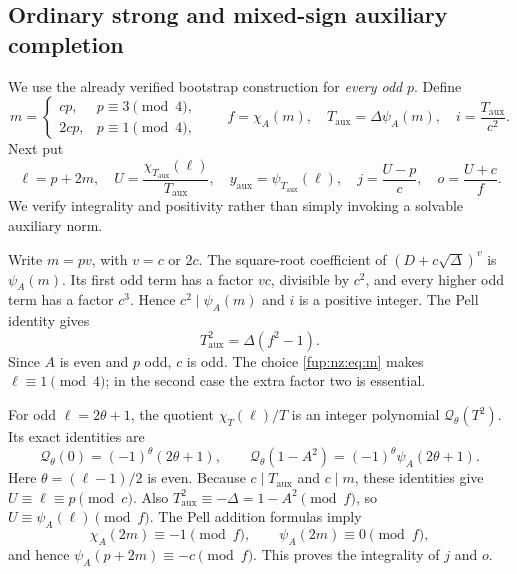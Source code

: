 \documentclass[11pt,letterpaper]{article}
\theoremstyle{definition}\newtheorem{definition}[theorem]{Definition}
\theoremstyle{remark}\newtheorem{remark}[theorem]{Remark}
\newcommand{\Taux}{T_{\mathrm{aux}}}\newcommand{\yaux}{y_{\mathrm{aux}}}
\begin{document}
\subsection{Ordinary strong and mixed-sign auxiliary completion}
We use the already verified bootstrap construction for \emph{every odd} $p$. Define
\begin{equation}\label{fup:nz:eq:m}
 m=\begin{cases}cp,&p\equiv3\pmod4,\\2cp,&p\equiv1\pmod4,\end{cases}
 \qquad f=\chi_A(m),\quad \Taux=\Delta\psi_A(m),\quad
 i=\frac{\Taux}{c^2}.
\end{equation}
Next put
\begin{equation}\label{fup:nz:eq:auxwitness}
 \ell=p+2m,\quad U=\frac{\chi_{\Taux}(\ell)}{\Taux},\quad
 \yaux=\psi_{\Taux}(\ell),\quad
 j=\frac{U-p}{c},\quad o=\frac{U+c}{f}.
\end{equation}
We verify integrality and positivity rather than simply invoking a solvable auxiliary norm.

Write $m=pv$, with $v=c$ or $2c$. The square-root coefficient of $(D+c\sqrt\Delta)^v$ is $\psi_A(m)$. Its first odd term has a factor $vc$, divisible by $c^2$, and every higher odd term has a factor $c^3$. Hence $c^2\mid\psi_A(m)$ and $i$ is a positive integer. The Pell identity gives
\[
 \Taux^2=\Delta(f^2-1).
\]
Since $A$ is even and $p$ odd, $c$ is odd. The choice \eqref{fup:nz:eq:m} makes $\ell\equiv1\pmod4$; in the second case the extra factor two is essential.

For odd $\ell=2\theta+1$, the quotient $\chi_T(\ell)/T$ is an integer polynomial $\mathcal Q_\theta(T^2)$. Its exact identities are
\[
 \mathcal Q_\theta(0)=(-1)^{\theta}(2\theta+1),\qquad
 \mathcal Q_\theta(1-A^2)=(-1)^{\theta}\psi_A(2\theta+1).
\]
Here $\theta=(\ell-1)/2$ is even. Because $c\mid\Taux$ and $c\mid m$, these identities give $U\equiv\ell\equiv p\pmod c$. Also $\Taux^2\equiv-\Delta=1-A^2\pmod f$, so $U\equiv\psi_A(\ell)\pmod f$. The Pell addition formulas imply
\[
 \chi_A(2m)\equiv-1\pmod f,\qquad
 \psi_A(2m)\equiv0\pmod f,
\]
and hence $\psi_A(p+2m)\equiv-c\pmod f$. This proves the integrality of $j$ and $o$.
\end{document}
